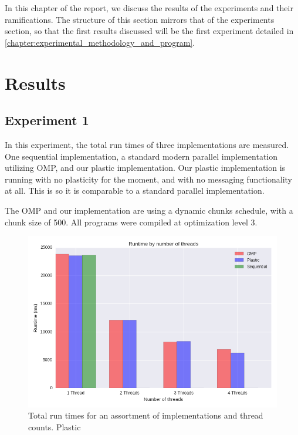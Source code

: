 

In this chapter of the report, we discuss the results of the experiments and their ramifications. The structure of this section mirrors that of the experiments section, so that the first results discussed will be the first experiment detailed in \ref{chapter:experimental_methodology_and_program}.

\section{Results}
\subsection{Experiment 1}

In this experiment, the total run times of three implementations are measured. One sequential implementation, a standard modern parallel implementation utilizing OMP, and our plastic implementation. Our plastic implementation is running with no plasticity for the moment, and with no messaging functionality at all. This is so it is comparable to a standard parallel implementation.

The OMP and our implementation are using a dynamic chunks schedule, with a chunk size of 500. All programs were compiled at optimization level 3.

\begin{figure}
	\includegraphics[width=1\textwidth]{graphics/runtime_by_number_of_threads.png}
	\caption{Total run times for an assortment of implementations and thread counts. Plastic }
	\label{fig:runtimes}
\end{figure}

